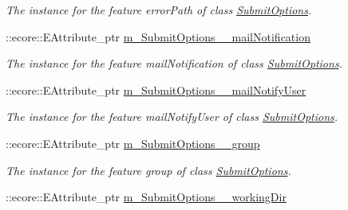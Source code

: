 \begin{DoxyCompactItemize}
\begin{DoxyCompactList}\small\item\em The instance for the feature errorPath of class \hyperlink{classTMS__Data_1_1SubmitOptions}{SubmitOptions}. \item\end{DoxyCompactList}\item 
\hypertarget{classTMS__Data_1_1TMS__DataPackage_aff8f6e075ba02e756aee75116475cd66}{
::ecore::EAttribute\_\-ptr \hyperlink{classTMS__Data_1_1TMS__DataPackage_aff8f6e075ba02e756aee75116475cd66}{m\_\-SubmitOptions\_\-\_\-mailNotification}}
\label{classTMS__Data_1_1TMS__DataPackage_aff8f6e075ba02e756aee75116475cd66}

\begin{DoxyCompactList}\small\item\em The instance for the feature mailNotification of class \hyperlink{classTMS__Data_1_1SubmitOptions}{SubmitOptions}. \item\end{DoxyCompactList}\item 
\hypertarget{classTMS__Data_1_1TMS__DataPackage_ac330a9987f0fc3848b46631aaf70efdc}{
::ecore::EAttribute\_\-ptr \hyperlink{classTMS__Data_1_1TMS__DataPackage_ac330a9987f0fc3848b46631aaf70efdc}{m\_\-SubmitOptions\_\-\_\-mailNotifyUser}}
\label{classTMS__Data_1_1TMS__DataPackage_ac330a9987f0fc3848b46631aaf70efdc}

\begin{DoxyCompactList}\small\item\em The instance for the feature mailNotifyUser of class \hyperlink{classTMS__Data_1_1SubmitOptions}{SubmitOptions}. \item\end{DoxyCompactList}\item 
\hypertarget{classTMS__Data_1_1TMS__DataPackage_aff4152d510984da9c597d09c98a8dafd}{
::ecore::EAttribute\_\-ptr \hyperlink{classTMS__Data_1_1TMS__DataPackage_aff4152d510984da9c597d09c98a8dafd}{m\_\-SubmitOptions\_\-\_\-group}}
\label{classTMS__Data_1_1TMS__DataPackage_aff4152d510984da9c597d09c98a8dafd}

\begin{DoxyCompactList}\small\item\em The instance for the feature group of class \hyperlink{classTMS__Data_1_1SubmitOptions}{SubmitOptions}. \item\end{DoxyCompactList}\item 
\hypertarget{classTMS__Data_1_1TMS__DataPackage_a5ddd787baa77a429cf07fdef49532fac}{
::ecore::EAttribute\_\-ptr \hyperlink{classTMS__Data_1_1TMS__DataPackage_a5ddd787baa77a429cf07fdef49532fac}{m\_\-SubmitOptions\_\-\_\-workingDir}}
\label{classTMS__Data_1_1TMS__DataPackage_a5ddd787baa77a429cf07fdef49532fac}


\end{DoxyCompactItemize}
